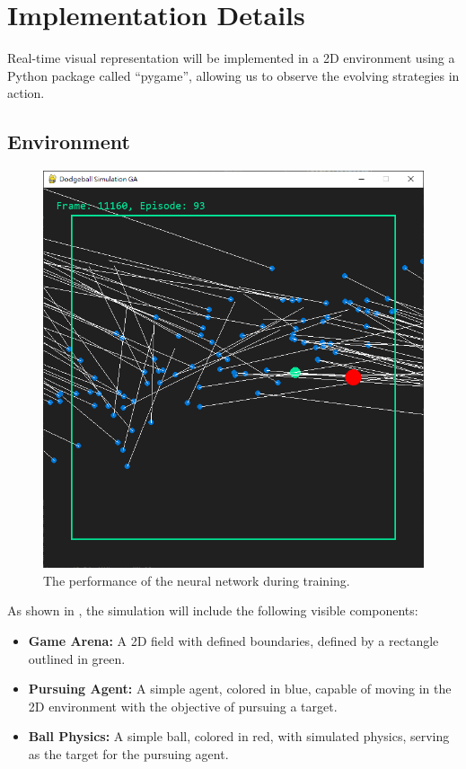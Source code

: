 \documentclass[sigconf]{acmart}
\begin{document}
\section{Implementation Details}
Real-time visual representation will be implemented in a 2D environment using a Python package called ``pygame'', allowing us to observe the evolving strategies in action. 
\subsection{Environment}
\begin{figure}[H]
  \centering
  \includegraphics[width=0.95\linewidth]{demo01.png}
  \caption{The performance of the neural network during training.}
  \label{fig:ball_demo}
\end{figure}
As shown in , the simulation will include the following visible components:
\begin{itemize}
  \item \textbf{Game Arena:} A 2D field with defined boundaries, defined by a rectangle outlined in green.
  \item \textbf{Pursuing Agent:} A simple agent, colored in blue, capable of moving in the 2D environment with the objective of pursuing a target.
  \item \textbf{Ball Physics:} A simple ball, colored in red, with simulated physics, serving as the target for the pursuing agent.
\end{itemize}
\end{document}
